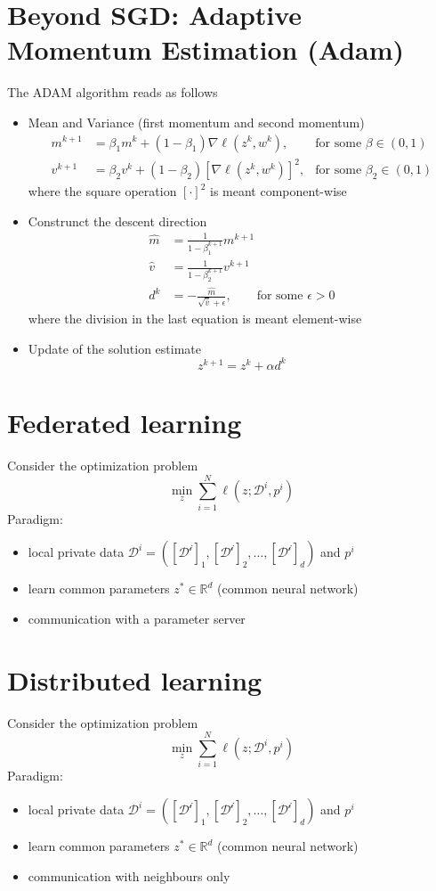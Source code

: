 \documentclass{book}
\newcommand{\R}{\mathbb{R}}
\theoremstyle{theoremv2}
\theoremstyle{defv2}
\theoremstyle{remark}
\theoremstyle{remark}
\theoremstyle{definition}
\theoremstyle{definition}
\begin{document}
\section{Beyond SGD: Adaptive Momentum Estimation (Adam)}
The ADAM algorithm reads as follows
\begin{itemize}
    \item Mean and Variance (first momentum and second momentum)
        \begin{align*}
            m^{k+1} & = \beta_1m^k+(1-\beta_1)\nabla\ell(z^k,w^k), &\text{for some } \beta\in(0,1)\\
            v^{k+1} & = \beta_2v^k+(1-\beta_2)[\nabla\ell(z^k,w^k)]^2, &\text{for some } \beta_2\in(0,1)
        \end{align*}
        where the square operation $[\cdot]^2$ is meant component-wise
    \item Construnct the descent direction
        \begin{align*}
            \hat{m} &= \displaystyle\frac{1}{1-\beta_1^{k+1}}m^{k+1}\\
            \hat{v} &= \displaystyle\frac{1}{1-\beta_2^{k+1}}v^{k+1}\\
            d^k &= -\displaystyle\frac{\hat{m}}{\sqrt{\hat{v}}+\epsilon}, \qquad \text{for some } \epsilon> 0
        \end{align*}
        where the division in the last equation is meant element-wise
    \item Update of the solution estimate 
        \[
            z^{k+1} = z^k + \alpha d^k
        \]
\end{itemize}

\section{Federated learning}
Consider the optimization problem 
\[
    \min_z \displaystyle\sum_{i=1}^{N}\ell(z;\mathcal{D}^i,p^i)
\]
Paradigm:
\begin{itemize}
    \item local private data $\mathcal{D}^i = ([\mathcal{D^i}]_1,[\mathcal{D^i}]_2,\dots,[\mathcal{D^i}]_d)$ and $p^i$
    \item learn common parameters $z^*\in\R^d$ (common neural network)
    \item communication with a parameter server
\end{itemize}

\section{Distributed learning}
Consider the optimization problem 
\[
    \min_z \displaystyle\sum_{i=1}^{N}\ell(z;\mathcal{D}^i,p^i)
\]
Paradigm:
\begin{itemize}
    \item local private data $\mathcal{D}^i = ([\mathcal{D^i}]_1,[\mathcal{D^i}]_2,\dots,[\mathcal{D^i}]_d)$ and $p^i$
    \item learn common parameters $z^*\in\R^d$ (common neural network)
    \item communication with neighbours only
\end{itemize}
\end{document}
